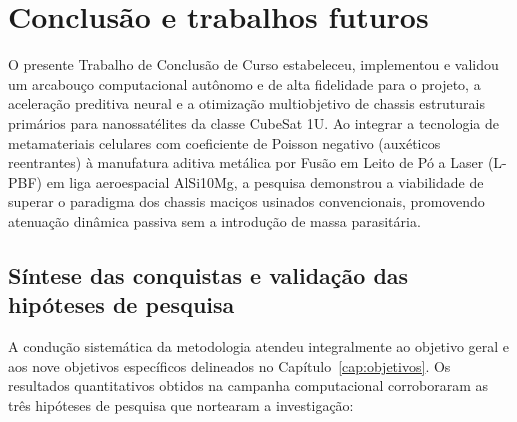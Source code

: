 \chapter{Conclusão e trabalhos futuros}
\label{cap:conclusao}

O presente Trabalho de Conclusão de Curso estabeleceu, implementou e validou um arcabouço computacional autônomo e de alta fidelidade para o projeto, a aceleração preditiva neural e a otimização multiobjetivo de chassis estruturais primários para nanossatélites da classe CubeSat 1U. Ao integrar a tecnologia de metamateriais celulares com coeficiente de Poisson negativo (auxéticos reentrantes) à manufatura aditiva metálica por Fusão em Leito de Pó a Laser (L-PBF) em liga aeroespacial AlSi10Mg, a pesquisa demonstrou a viabilidade de superar o paradigma dos chassis maciços usinados convencionais, promovendo atenuação dinâmica passiva sem a introdução de massa parasitária.

\section{Síntese das conquistas e validação das hipóteses de pesquisa}
\label{sec:conquistas}

A condução sistemática da metodologia atendeu integralmente ao objetivo geral e aos nove objetivos específicos delineados no Capítulo~\ref{cap:objetivos}. Os resultados quantitativos obtidos na campanha computacional corroboraram as três hipóteses de pesquisa que nortearam a investigação:

